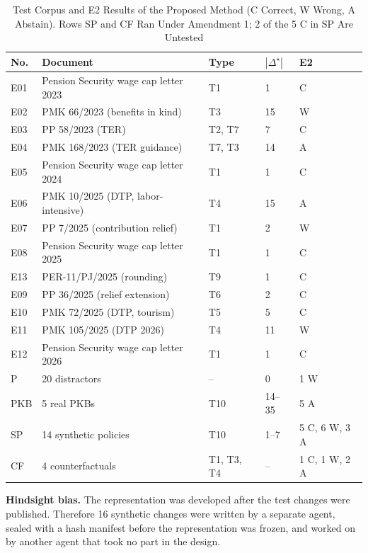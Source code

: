 \documentclass[conference]{IEEEtran}
\newcommand{\gold}{\star}
\begin{document}
\begin{table}[t]
\centering
\caption{Test Corpus and E2 Results of the Proposed Method (C Correct, W Wrong, A Abstain). Rows SP and CF Ran Under Amendment 1; 2 of the 5 C in SP Are Untested}
\label{tab:korpus}
\scriptsize
\setlength{\tabcolsep}{3pt}
\begin{tabularx}{\columnwidth}{@{}P{0.6cm} L P{0.85cm} P{0.65cm} P{1.0cm}@{}}
\toprule
\textbf{No.} & \textbf{Document} & \textbf{Type} & $|\Delta^{\gold}|$ & \textbf{E2} \\
\midrule
E01 & Pension Security wage cap letter 2023 & T1 & 1 & C \\
E02 & PMK 66/2023 (benefits in kind) & T3 & 15 & W \\
E03 & PP 58/2023 (TER) & T2, T7 & 7 & C \\
E04 & PMK 168/2023 (TER guidance) & T7, T3 & 14 & A \\
E05 & Pension Security wage cap letter 2024 & T1 & 1 & C \\
E06 & PMK 10/2025 (DTP, labor-intensive) & T4 & 15 & A \\
E07 & PP 7/2025 (contribution relief) & T1 & 2 & W \\
E08 & Pension Security wage cap letter 2025 & T1 & 1 & C \\
E13 & PER-11/PJ/2025 (rounding) & T9 & 1 & C \\
E09 & PP 36/2025 (relief extension) & T6 & 2 & C \\
E10 & PMK 72/2025 (DTP, tourism) & T5 & 5 & C \\
E11 & PMK 105/2025 (DTP 2026) & T4 & 11 & W \\
E12 & Pension Security wage cap letter 2026 & T1 & 1 & C \\
\midrule
P & 20 distractors & -- & 0 & 1 W \\
PKB & 5 real PKBs & T10 & 14--35 & 5 A \\
SP & 14 synthetic policies & T10 & 1--7 & 5 C, 6 W, 3 A \\
CF & 4 counterfactuals & T1, T3, T4 & -- & 1 C, 1 W, 2 A \\
\bottomrule
\end{tabularx}
\end{table}

\textbf{Hindsight bias.} The representation was developed after the test changes were published. Therefore 16 synthetic changes were written by a separate agent, sealed with a hash manifest before the representation was frozen, and worked on by another agent that took no part in the design.
\end{document}
